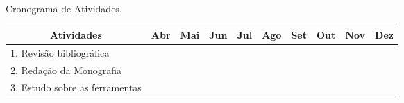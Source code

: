 \begin{quadro}[!htb]
    \centering
    \caption{Cronograma de Atividades.\label{qua:quadro-cronograma}}
\begin{tabular}{|l|l|l|l|l|l|l|l|l|l|}
\hline
\multicolumn{1}{|c|}{{\color[HTML]{333333} \textbf{Atividades}}}                                                           & \multicolumn{1}{c|}{{\color[HTML]{333333} \textbf{Abr}}} & \multicolumn{1}{c|}{{\color[HTML]{333333} \textbf{Mai}}} & \multicolumn{1}{c|}{{\color[HTML]{333333} \textbf{Jun}}} & \multicolumn{1}{c|}{{\color[HTML]{333333} \textbf{Jul}}} & \multicolumn{1}{c|}{{\color[HTML]{333333} \textbf{Ago}}} & \multicolumn{1}{c|}{{\color[HTML]{333333} \textbf{Set}}} & \multicolumn{1}{c|}{{\color[HTML]{333333} \textbf{Out}}} & \multicolumn{1}{c|}{{\color[HTML]{333333} \textbf{Nov}}} & \multicolumn{1}{c|}{{\color[HTML]{333333} \textbf{Dez}}} \\ \hline
{\color[HTML]{333333} 1. Revisão bibliográfica}                                                                            & \cellcolor[HTML]{9B9B9B}{\color[HTML]{333333} }          & \cellcolor[HTML]{9B9B9B}{\color[HTML]{333333} }          & \cellcolor[HTML]{9B9B9B}{\color[HTML]{333333} }          & \cellcolor[HTML]{9B9B9B}{\color[HTML]{333333} }          & {\color[HTML]{333333} }                                  & {\color[HTML]{333333} }                                  & {\color[HTML]{333333} }                                  & {\color[HTML]{333333} }                                  & {\color[HTML]{333333} }                                  \\ \hline
{\color[HTML]{333333} 2. Redação da Monografia}                                                                            & {\color[HTML]{333333} }                                  & {\color[HTML]{333333} }                                  & \cellcolor[HTML]{9B9B9B}{\color[HTML]{333333} }          & \cellcolor[HTML]{9B9B9B}{\color[HTML]{333333} }          & \cellcolor[HTML]{9B9B9B}{\color[HTML]{333333} }          & \cellcolor[HTML]{9B9B9B}{\color[HTML]{333333} }          & \cellcolor[HTML]{9B9B9B}{\color[HTML]{333333} }          & \cellcolor[HTML]{9B9B9B}{\color[HTML]{333333} }          & {\color[HTML]{333333} }                                  \\ \hline
{\color[HTML]{333333} 3. Estudo sobre as ferramentas}                                                                      & {\color[HTML]{333333} }                                  & {\color[HTML]{333333} }                                  & \cellcolor[HTML]{9B9B9B}{\color[HTML]{333333} }          & \cellcolor[HTML]{9B9B9B}{\color[HTML]{333333} }          & \cellcolor[HTML]{9B9B9B}{\color[HTML]{333333} }          & \cellcolor[HTML]{9B9B9B}{\color[HTML]{333333} }          & {\color[HTML]{333333} }                                  & {\color[HTML]{333333} }                                  & {\color[HTML]{333333} }                                  \\ \hline

\end{tabular}
\end{quadro}
